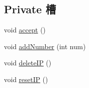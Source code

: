 \subsection*{Private 槽}
\begin{DoxyCompactItemize}
\item 
void \hyperlink{classguest_window_aac186524cb82d0776088d59ea84c5d54_aac186524cb82d0776088d59ea84c5d54}{accept} ()
\item 
void \hyperlink{classguest_window_a2400ccf7dd303656bfd6b66c212aa7ed_a2400ccf7dd303656bfd6b66c212aa7ed}{add\+Number} (int num)
\item 
void \hyperlink{classguest_window_a18c63e55961c253784e35e07f40d88ef_a18c63e55961c253784e35e07f40d88ef}{delete\+IP} ()
\item 
void \hyperlink{classguest_window_a51ef34507e3c18b981a9f0e62f36e9b4_a51ef34507e3c18b981a9f0e62f36e9b4}{reset\+IP} ()
\end{DoxyCompactItemize}
